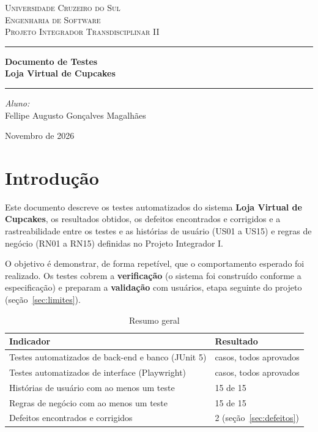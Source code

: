 \documentclass[12pt]{article}
\begin{document}
\begin{titlepage}
    \centering
    \textsc{\Large Universidade Cruzeiro do Sul}\\[0.5cm]
    \textsc{\Large Engenharia de Software}\\[0.5cm]
    \textsc{Projeto Integrador Transdisciplinar II}
    \vspace{2.5cm}

    \hrule \vspace{0.4cm}
    {\huge \bfseries Documento de Testes\\[0.3cm] Loja Virtual de Cupcakes}\\[0.4cm]
    \hrule
    \vspace{3cm}

    \begin{flushleft}
        \Large \emph{Aluno:}\\
        Fellipe Augusto Gonçalves Magalhães
    \end{flushleft}
    \vfill
    {\large Novembro de 2026}
\end{titlepage}

\tableofcontents
\newpage

\section{Introdução}

Este documento descreve os testes automatizados do sistema \textbf{Loja Virtual de Cupcakes}, os resultados obtidos, os defeitos encontrados e corrigidos e a rastreabilidade entre os testes e as histórias de usuário (US01 a US15) e regras de negócio (RN01 a RN15) definidas no Projeto Integrador I.

O objetivo é demonstrar, de forma repetível, que o comportamento esperado foi realizado. Os testes cobrem a \textbf{verificação} (o sistema foi construído conforme a especificação) e preparam a \textbf{validação} com usuários, etapa seguinte do projeto (seção~\ref{sec:limites}).

\begin{table}[H]
\centering\renewcommand{\arraystretch}{1.3}
\begin{tabular}{|p{6cm}|p{7.4cm}|}
\hline
\rowcolor{gray!30} \textbf{Indicador} & \textbf{Resultado} \\ \hline
Testes automatizados de back-end e banco (JUnit 5) &  casos, todos aprovados \\ \hline
Testes automatizados de interface (Playwright) &  casos, todos aprovados \\ \hline
Histórias de usuário com ao menos um teste & 15 de 15 \\ \hline
Regras de negócio com ao menos um teste & 15 de 15 \\ \hline
Defeitos encontrados e corrigidos & 2 (seção~\ref{sec:defeitos}) \\ \hline
\end{tabular}
\caption{Resumo geral}
\end{table}
\end{document}
